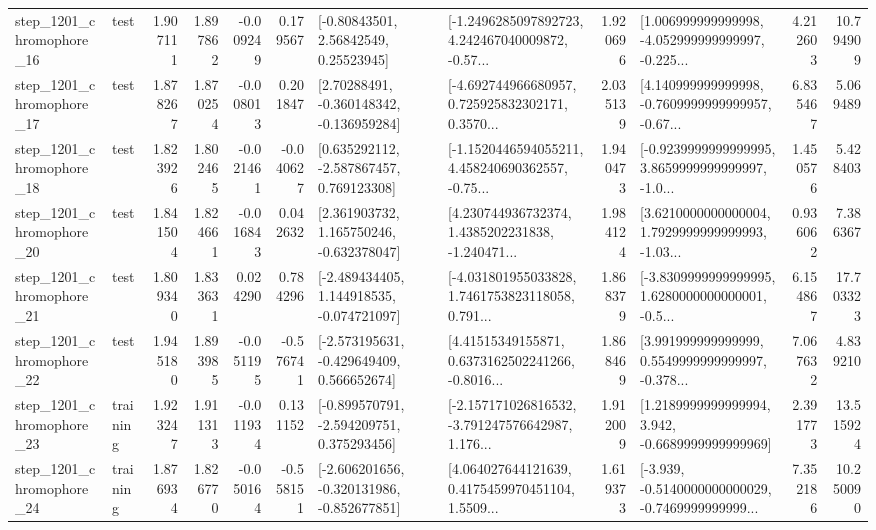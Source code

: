 \begin{tabular}{llrrrrllrlrr}
 step\_1201\_chromophore\_16 &      test &      1.907111 &    1.897862 &     -0.009249 &  0.179567 &       [-0.80843501, 2.56842549, 0.25523945] &  [-1.2496285097892723, 4.242467040009872, -0.57... &       1.920696 &  [1.006999999999998, -4.052999999999997, -0.225... &            4.212603 &         10.794909 \\
 step\_1201\_chromophore\_17 &      test &      1.878267 &    1.870254 &     -0.008013 &  0.201847 &    [2.70288491, -0.360148342, -0.136959284] &  [-4.692744966680957, 0.725925832302171, 0.3570... &       2.035139 &  [4.140999999999998, -0.7609999999999957, -0.67... &            6.835467 &          5.069489 \\
 step\_1201\_chromophore\_18 &      test &      1.823926 &    1.802465 &     -0.021461 & -0.040627 &    [0.635292112, -2.587867457, 0.769123308] &  [-1.1520446594055211, 4.458240690362557, -0.75... &       1.940473 &  [-0.9239999999999995, 3.8659999999999997, -1.0... &            1.450576 &          5.428403 \\
 step\_1201\_chromophore\_20 &      test &      1.841504 &    1.824661 &     -0.016843 &  0.042632 &    [2.361903732, 1.165750246, -0.632378047] &  [4.230744936732374, 1.4385202231838, -1.240471... &       1.984124 &  [3.6210000000000004, 1.7929999999999993, -1.03... &            0.936062 &          7.386367 \\
 step\_1201\_chromophore\_21 &      test &      1.809340 &    1.833631 &      0.024290 &  0.784296 &   [-2.489434405, 1.144918535, -0.074721097] &  [-4.031801955033828, 1.7461753823118058, 0.791... &       1.868379 &  [-3.8309999999999995, 1.6280000000000001, -0.5... &            6.154867 &         17.703323 \\
 step\_1201\_chromophore\_22 &      test &      1.945180 &    1.893985 &     -0.051195 & -0.576741 &   [-2.573195631, -0.429649409, 0.566652674] &  [4.41515349155871, 0.6373162502241266, -0.8016... &       1.868469 &  [3.991999999999999, 0.5549999999999997, -0.378... &            7.067632 &          4.839210 \\
 step\_1201\_chromophore\_23 &  training &      1.923247 &    1.911313 &     -0.011934 &  0.131152 &   [-0.899570791, -2.594209751, 0.375293456] &  [-2.157171026816532, -3.791247576642987, 1.176... &       1.912009 &   [1.2189999999999994, 3.942, -0.6689999999999969] &            2.391773 &         13.515924 \\
 step\_1201\_chromophore\_24 &  training &      1.876934 &    1.826770 &     -0.050164 & -0.558151 &  [-2.606201656, -0.320131986, -0.852677851] &  [4.064027644121639, 0.4175459970451104, 1.5509... &       1.619373 &  [-3.939, -0.5140000000000029, -0.7469999999999... &            7.352186 &         10.250090 \\

\end{tabular}
